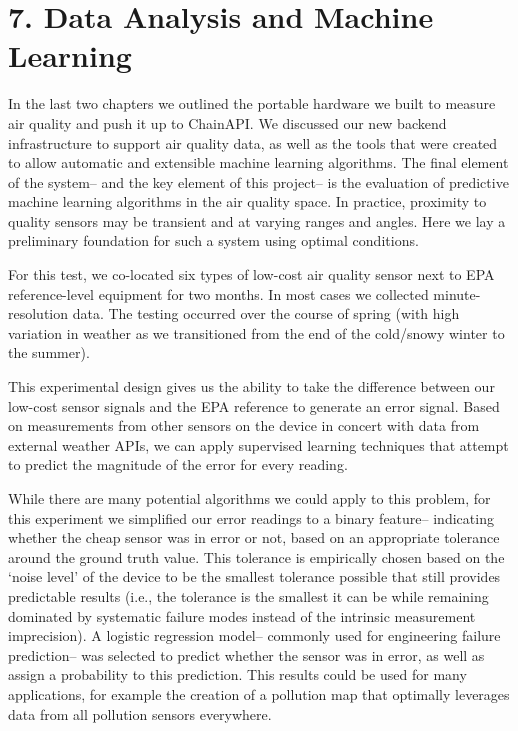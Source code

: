 \chapter{7. Data Analysis and Machine Learning}

In the last two chapters we outlined the portable hardware we built to measure air quality and push it up to ChainAPI.  We discussed our new backend infrastructure to support air quality data, as well as the tools that were created to allow automatic and extensible machine learning algorithms.  The final element of the system-- and the key element of this project-- is the evaluation of predictive machine learning algorithms in the air quality space.  In practice, proximity to quality sensors may be transient and at varying ranges and angles.  Here we lay a preliminary foundation for such a system using optimal conditions.
 
For this test, we co-located six types of low-cost air quality sensor next to EPA reference-level equipment for two months.  In most cases we collected minute-resolution data.  The testing occurred over the course of spring (with high variation in weather as we transitioned from the end of the cold/snowy winter to the summer).  

This experimental design gives us the ability to take the difference between our low-cost sensor signals and the EPA reference to generate an error signal.  Based on measurements from other sensors on the device in concert with data from external weather APIs, we can apply supervised learning techniques that attempt to predict the magnitude of the error for every reading.  

While there are many potential algorithms we could apply to this problem, for this experiment we simplified our error readings to a binary feature-- indicating whether the cheap sensor was in error or not, based on an appropriate tolerance around the ground truth value.  This tolerance is empirically chosen based on the `noise level' of the device to be the smallest tolerance possible that still provides predictable results (i.e., the tolerance is the smallest it can be while remaining dominated by systematic failure modes instead of the intrinsic measurement imprecision).  A logistic regression model-- commonly used for engineering failure prediction-- was selected to predict whether the sensor was in error, as well as assign a probability to this prediction.  This results could be used for many applications, for example the creation of a pollution map that optimally leverages data from all pollution sensors everywhere.

